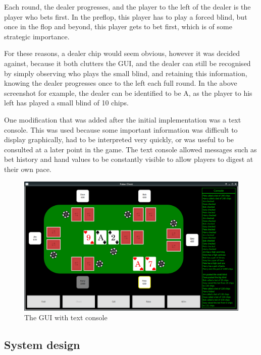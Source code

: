 Each round, the dealer progresses, and the player to
the left of the dealer is the player who bets first. In the preflop, this
player has to play a forced blind, but once in the flop and beyond, this player
gets to bet first, which is of some strategic importance. 

For these reasons, a dealer chip would seem obvious, however it was decided
against, because it both clutters the GUI, and the dealer can still be
recognised by simply observing who plays the small blind, and retaining this
information, knowing the dealer progresses once to the left each full round.
In the above screenshot for example, the dealer can be identified to be A,
as the player to his left has played a small blind of 10 chips.

One modification that was added after the initial implementation was a text
console. This was used because some important information was difficult to 
display graphically, had to be interpreted very quickly, or was useful to be 
consulted at a later point in the game. The text console allowed messages such 
as bet history and hand values to be constantly visible to allow players to 
digest at their own pace.

\begin{figure}[H]
    \centering
    \includegraphics[width=\textwidth]{../images/guiwithconsole.png}
    \caption{The GUI with text console}%
    \label{fig:guiwithconsole}
\end{figure}

\newpage{}

\subsection{System design}

